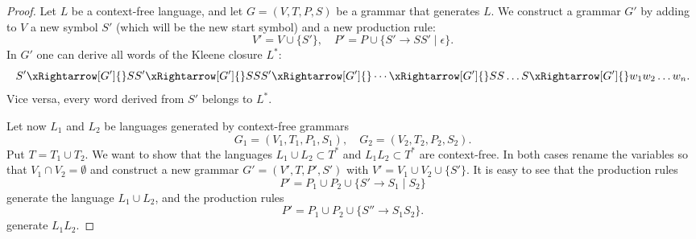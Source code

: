 
\begin{proof}
Let $L$ be a context-free language, and let $G = (V, T, P, S)$ be a grammar that generates $L$.
We construct a grammar $G'$ by adding to $V$ a new symbol $S'$ (which will be the new start symbol) and a new production rule:
\[
V' = V \cup \{S'\}, \quad P' = P \cup \{S' \to SS' \mid \epsilon\}.
\]
In $G'$ one can derive all words of the Kleene closure $L^*$:
\[
S' \xRightarrow[G']{} SS' \xRightarrow[G']{} SSS' \xRightarrow[G']{} \cdots \xRightarrow[G']{} SS \ldots S \xRightarrow[G']{} w_1 w_2 \ldots w_n.
\]
Vice versa, every word derived from $S'$ belongs to $L^*$.

Let now $L_1$ and $L_2$ be languages generated by context-free grammars
\[
G_1 = (V_1, T_1, P_1, S_1), \quad G_2 = (V_2, T_2, P_2, S_2).
\]
Put $T = T_1 \cup T_2$.
We want to show that the languages $L_1 \cup L_2 \subset T^*$ and $L_1L_2 \subset T^*$ are context-free.
In both cases rename the variables so that $V_1 \cap V_2 = \emptyset$
and construct a new grammar $G' = (V', T, P', S')$ with $V' = V_1 \cup V_2 \cup \{S'\}$.
It is easy to see that the production rules
\[
P' = P_1 \cup P_2 \cup \{S' \to S_1 \mid S_2\}
\]
generate the language $L_1 \cup L_2$,
and the production rules
\[
P' = P_1 \cup P_2 \cup \{S'' \to S_1S_2\}.
\]
generate $L_1L_2$.
\end{proof}
